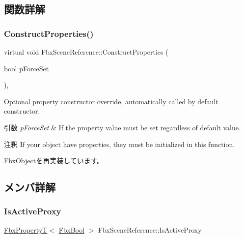 \subsection{関数詳解}
\mbox{\label{class_fbx_scene_reference_a93aabe2339dc932673dacb8be72eb813}} 
\subsubsection{\texorpdfstring{Construct\+Properties()}{ConstructProperties()}}
{\footnotesize\ttfamily virtual void Fbx\+Scene\+Reference\+::\+Construct\+Properties (\begin{DoxyParamCaption}\item[{bool}]{p\+Force\+Set }\end{DoxyParamCaption})\hspace{0.3cm}{\ttfamily [protected]}, {\ttfamily [virtual]}}

Optional property constructor override, automatically called by default constructor. 
\begin{DoxyParams}{引数}
{\em p\+Force\+Set} & If the property value must be set regardless of default value. \\
\hline
\end{DoxyParams}
\begin{DoxyRemark}{注釈}
If your object have properties, they must be initialized in this function. 
\end{DoxyRemark}


\hyperlink{class_fbx_object_ad44f814323dc1b5e78bff1bfc608b4bb}{Fbx\+Object}を再実装しています。



\subsection{メンバ詳解}
\mbox{\label{class_fbx_scene_reference_aab3571ac4fd553d5f3fbb3710c39adac}} 
\subsubsection{\texorpdfstring{Is\+Active\+Proxy}{IsActiveProxy}}
{\footnotesize\ttfamily \hyperlink{class_fbx_property_t}{Fbx\+PropertyT}$<$ \hyperlink{fbxtypes_8h_a92e0562b2fe33e76a242f498b362262e}{Fbx\+Bool} $>$ Fbx\+Scene\+Reference\+::\+Is\+Active\+Proxy}



